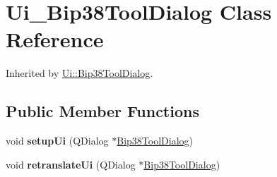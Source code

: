\hypertarget{class_ui___bip38_tool_dialog}{}\section{Ui\+\_\+\+Bip38\+Tool\+Dialog Class Reference}
\label{class_ui___bip38_tool_dialog}


Inherited by \mbox{\hyperlink{class_ui_1_1_bip38_tool_dialog}{Ui\+::\+Bip38\+Tool\+Dialog}}.

\subsection*{Public Member Functions}
\begin{DoxyCompactItemize}
\item 
\mbox{\label{class_ui___bip38_tool_dialog_af174d723163e071b3e934d21b1b076a0}} 
void {\bfseries setup\+Ui} (Q\+Dialog $\ast$\mbox{\hyperlink{class_bip38_tool_dialog}{Bip38\+Tool\+Dialog}})
\item 
\mbox{\label{class_ui___bip38_tool_dialog_a155b914da83647c13111825e39f905a5}} 
void {\bfseries retranslate\+Ui} (Q\+Dialog $\ast$\mbox{\hyperlink{class_bip38_tool_dialog}{Bip38\+Tool\+Dialog}})
\end{DoxyCompactItemize}
